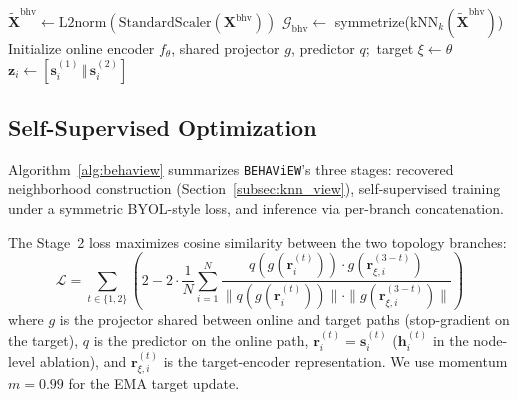 \documentclass[sigconf,natbib=true,anonymous=true]{acmart}
\theoremstyle{definition}
\newcommand{\method}{\texttt{BEHAViEW}\xspace}
\begin{document}
\begin{algorithm}[t]
\caption{Training and Inference}
\label{alg:behaview}
\BlankLine
{}
$\tilde{\mathbf{X}}^{\text{bhv}} \gets \mathrm{L2norm}(\mathrm{StandardScaler}(\mathbf{X}^{\text{bhv}}))$\;
$\mathcal{G}_{\text{bhv}} \gets$ symmetrize($\mathrm{kNN}_k(\tilde{\mathbf{X}}^{\text{bhv}})$) 
\BlankLine
{}
Initialize online encoder $f_\theta$, shared projector $g$, predictor $q$;\ target $\xi \gets \theta$\;
\BlankLine
{}
$\mathbf{z}_i \gets [\mathbf{s}_i^{(1)} \,\Vert\, \mathbf{s}_i^{(2)}]$ 
\end{algorithm}

\subsection{Self-Supervised Optimization}
\label{subsec:contrastive_learning}

Algorithm~\ref{alg:behaview} summarizes \method's three stages: recovered neighborhood construction (Section~\ref{subsec:knn_view}), self-supervised training under a symmetric BYOL-style loss, and inference via per-branch concatenation.

The Stage~2 loss maximizes cosine similarity between the two topology branches:
\begin{equation}\label{eq:loss}
    \mathcal{L} = \sum_{t \in \{1,2\}} \left(2 - 2 \cdot \frac{1}{N}\sum_{i=1}^{N} \frac{q(g(\mathbf{r}_i^{(t)})) \cdot g(\mathbf{r}_{\xi,i}^{(3-t)})}{\|q(g(\mathbf{r}_i^{(t)}))\| \cdot \|g(\mathbf{r}_{\xi,i}^{(3-t)})\|}\right)
\end{equation}
where $g$ is the projector shared between online and target paths (stop-gradient on the target), $q$ is the predictor on the online path, $\mathbf{r}_i^{(t)}{=}\mathbf{s}_i^{(t)}$ ($\mathbf{h}_i^{(t)}$ in the node-level ablation), and $\mathbf{r}_{\xi,i}^{(t)}$ is the target-encoder representation. We use momentum $m{=}0.99$ for the EMA target update.
\end{document}
